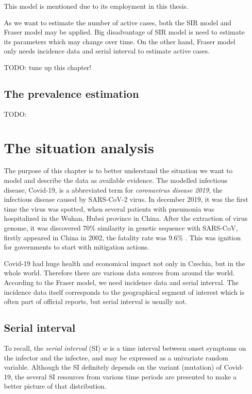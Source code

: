 \documentclass[
  digital, %
  table,   %
  twoside, %
  12pt,
  lof,     %
  lot,     %
]{fithesis3}
\begin{document}
This model is mentioned due to its employment in this thesis.

As we want to estimate the number of active cases, both the 
SIR model and Fraser model may be applied. 
Big disadvantage of SIR model is need to estimate its 
parameters which may change over time. 
On the other hand, Fraser model only needs incidence 
data and serial interval to estimate active cases.

TODO: tune up this chapter!

\section{The prevalence estimation}

TODO:


\chapter{The situation analysis}

The purpose of this chapter is to better understand the situation 
we want to model and describe the data as available evidence. 
The modelled infectious disease, Covid-19, is a abbreviated 
term for \textit{coronavirus disease 2019}, the infectious disease 
caused by SARS-CoV-2 virus. 
In december 2019, it was the first time the virus was spotted, 
when several patients with pneumonia was hospitalized in the 
Wuhan, Hubei province in China. 
After the extraction of virus genome, it was discovered 
70\% similarity in genetic sequence with SARS-CoV, 
firstly appeared in China in 2002, the fatality rate 
was 9.6\% \cite{hui2019}.
This was ignition for governments to start with mitigation 
actions.

Covid-19 had huge health and economical impact not only in 
Czechia, but in the whole world. 
Therefore there are various data sources from around the world. 
According to the Fraser model, we need incidence data and 
serial interval.
The incidence data itself corresponds to the geographical 
segment of interest which is often part of official reports, 
but serial interval is usually not.

\section{Serial interval}

To recall, the \textit{serial interval} (SI) $w$ is a time 
interval between onset symptoms on the infector and the 
infectee, and may be expressed as a univariate random variable. 
Although the SI definitely depends on the variant (mutation) of 
Covid-19, the several SI resources from various time periods are 
presented to make a better picture of that distribution.
\end{document}
